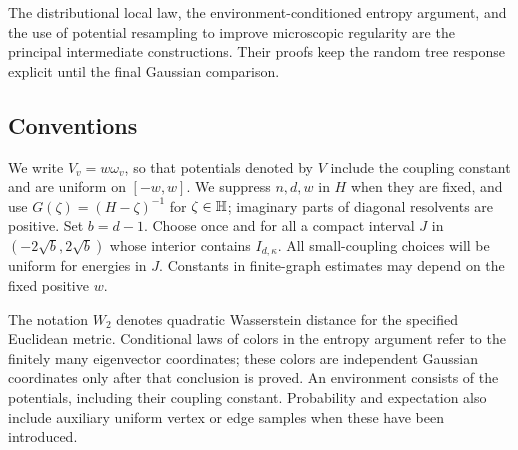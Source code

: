 The distributional local law, the environment-conditioned entropy
argument, and the use of potential resampling to improve microscopic
regularity are the principal intermediate constructions.  Their proofs
keep the random tree response explicit until the final Gaussian
comparison.

\subsection{Conventions}

We write $V_v=w\omega_v$, so that potentials denoted by $V$ include
the coupling constant and are uniform on $[-w,w]$.  We suppress $n,d,w$
in $H$ when they are fixed, and use
$G(\zeta)=(H-\zeta)^{-1}$ for $\zeta\in\mathbb H$; imaginary parts of diagonal
resolvents are positive.  Set $b=d-1$.  Choose once and for all a compact
interval $J$ in $(-2\sqrt b,2\sqrt b)$ whose interior contains
$I_{d,\kappa}$.  All small-coupling choices will be uniform for energies
in $J$.  Constants in finite-graph estimates may depend on the fixed
positive $w$.

The notation $W_2$ denotes quadratic Wasserstein distance for the specified
Euclidean metric.  Conditional laws of colors in the entropy argument
refer to the finitely many eigenvector coordinates; these colors are
independent Gaussian coordinates only after that conclusion is proved.
An environment consists of the potentials, including their coupling
constant.  Probability and expectation also include auxiliary uniform
vertex or edge samples when these have been introduced.

